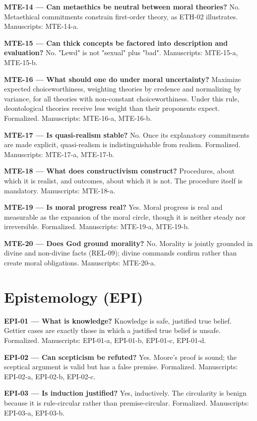 \documentclass[10pt]{article}
\begin{document}
\textbf{MTE-14 --- Can metaethics be neutral between moral theories?} No. Metaethical commitments constrain first-order theory, as ETH-02 illustrates. Manuscripts: MTE-14-a.

\textbf{MTE-15 --- Can thick concepts be factored into description and evaluation?} No. "Lewd" is not "sexual" plus "bad". Manuscripts: MTE-15-a, MTE-15-b.

\textbf{MTE-16 --- What should one do under moral uncertainty?} Maximize expected choiceworthiness, weighting theories by credence and normalizing by variance, for all theories with non-constant choiceworthiness. Under this rule, deontological theories receive less weight than their proponents expect. Formalized. Manuscripts: MTE-16-a, MTE-16-b.

\textbf{MTE-17 --- Is quasi-realism stable?} No. Once its explanatory commitments are made explicit, quasi-realism is indistinguishable from realism. Formalized. Manuscripts: MTE-17-a, MTE-17-b.

\textbf{MTE-18 --- What does constructivism construct?} Procedures, about which it is realist, and outcomes, about which it is not. The procedure itself is mandatory. Manuscripts: MTE-18-a.

\textbf{MTE-19 --- Is moral progress real?} Yes. Moral progress is real and measurable as the expansion of the moral circle, though it is neither steady nor irreversible. Formalized. Manuscripts: MTE-19-a, MTE-19-b.

\textbf{MTE-20 --- Does God ground morality?} No. Morality is jointly grounded in divine and non-divine facts (REL-09); divine commands confirm rather than create moral obligations. Manuscripts: MTE-20-a.

\section*{Epistemology (EPI)}
\textbf{EPI-01 --- What is knowledge?} Knowledge is safe, justified true belief. Gettier cases are exactly those in which a justified true belief is unsafe. Formalized. Manuscripts: EPI-01-a, EPI-01-b, EPI-01-c, EPI-01-d.

\textbf{EPI-02 --- Can scepticism be refuted?} Yes. Moore's proof is sound; the sceptical argument is valid but has a false premise. Formalized. Manuscripts: EPI-02-a, EPI-02-b, EPI-02-c.

\textbf{EPI-03 --- Is induction justified?} Yes, inductively. The circularity is benign because it is rule-circular rather than premise-circular. Formalized. Manuscripts: EPI-03-a, EPI-03-b.
\end{document}
